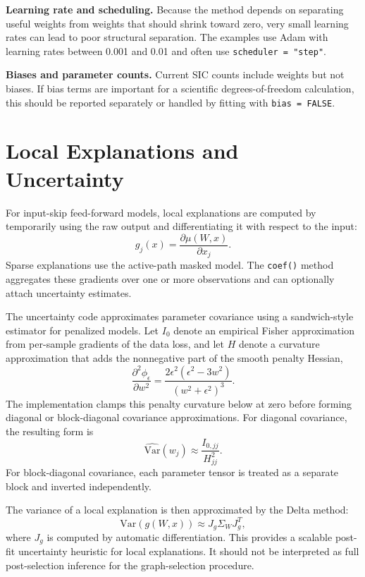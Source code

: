 \documentclass{article}
\begin{document}
\textbf{Learning rate and scheduling.}
Because the method depends on separating useful weights from weights that should shrink toward zero, very small learning rates can lead to poor structural separation. The examples use Adam with learning rates between 0.001 and 0.01 and often use \texttt{scheduler = "step"}.

\textbf{Biases and parameter counts.}
Current SIC counts include weights but not biases. If bias terms are important for a scientific degrees-of-freedom calculation, this should be reported separately or handled by fitting with \texttt{bias = FALSE}.

\section{Local Explanations and Uncertainty}
For input-skip feed-forward models, local explanations are computed by temporarily using the raw output and differentiating it with respect to the input:
\begin{equation}
g_j(x)=\frac{\partial \mu(W,x)}{\partial x_j}.
\end{equation}
Sparse explanations use the active-path masked model. The \texttt{coef()} method aggregates these gradients over one or more observations and can optionally attach uncertainty estimates.

The uncertainty code approximates parameter covariance using a sandwich-style estimator for penalized models. Let \(I_0\) denote an empirical Fisher approximation from per-sample gradients of the data loss, and let \(H\) denote a curvature approximation that adds the nonnegative part of the smooth penalty Hessian,
\begin{equation}
\frac{\partial^2 \phi_\epsilon}{\partial w^2}
=
\frac{2\epsilon^2(\epsilon^2-3w^2)}{(w^2+\epsilon^2)^3}.
\end{equation}
The implementation clamps this penalty curvature below at zero before forming diagonal or block-diagonal covariance approximations. For diagonal covariance, the resulting form is
\begin{equation}
\widehat{\mathrm{Var}}(w_j)
\approx
\frac{I_{0,jj}}{H_{jj}^2}.
\end{equation}
For block-diagonal covariance, each parameter tensor is treated as a separate block and inverted independently.

The variance of a local explanation is then approximated by the Delta method:
\begin{equation}
\mathrm{Var}(g(W,x)) \approx J_g \Sigma_W J_g^T,
\end{equation}
where \(J_g\) is computed by automatic differentiation. This provides a scalable post-fit uncertainty heuristic for local explanations. It should not be interpreted as full post-selection inference for the graph-selection procedure.
\end{document}
